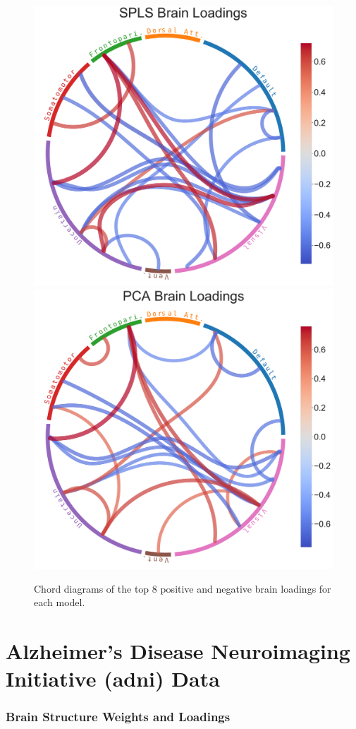 \begin{figure}
    \includegraphics[width=0.49\linewidth]{figures/hcp/SPLS brain loadings}
    \includegraphics[width=0.49\linewidth]{figures/hcp/PCA brain loadings}
    \caption{Chord diagrams of the top 8 positive and negative brain \gls{loadings} for each model.}\label{fig:chord_loadings}
\end{figure}

\newpage


\section{Alzheimer's Disease Neuroimaging Initiative (\acrshort{adni}) Data}

\subsubsection{Brain Structure Weights and Loadings}

